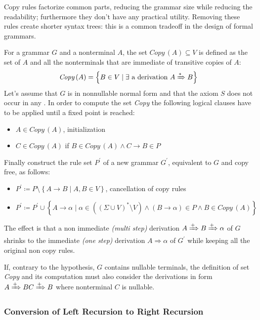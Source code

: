 \documentclass[english]{article}
\begin{document}
Copy rules factorize common parts, reducing the grammar size while reducing the readability;
furthermore they don't have any practical utility.
Removing these rules create shorter syntax trees: this is a common tradeoff in the design of formal grammars.

For a grammar \(G\) and a nonterminal \(A\), the set \(\textit{Copy}\,(A) \subseteq V\) is defined as the set of \(A\) and all the nonterminals that are immediate of transitive copies of \(A\):
\[ \textit{Copy}\,(A) = \left\{ B \in V \mid \exists \text{ a derivation } A \xRightarrow{\ast} B \right\} \]
Let's assume that \(G\) is in nonnullable normal form and that the axiom \(S\) does not occur in any \RP.
In order to compute the set \textit{Copy} the following logical clauses have to be applied until a fixed point is reached:
\begin{itemize}
  \item \(A \in \textit{Copy}\,(A)\), initialization
  \item \(C \in \textit{Copy}\,(A)\) if \(B \in \textit{Copy}\,(A) \land C \rightarrow B \in P\)
\end{itemize}
Finally construct the rule set \(P^\prime\) of a new grammar \(G^\prime\), equivalent to \(G\) and copy free, as follows:
\begin{itemize}
  \item \(P^\prime \coloneqq P \setminus \left\{ A \rightarrow B \mid A, B \in V \right\}\), cancellation of copy rules
  \item \(P^\prime \coloneqq P^\prime \cup \left\{ A \rightarrow \alpha \mid \alpha \in \left( \left( \Sigma \cup V \right)^\ast \setminus V \right) \land \left( B \rightarrow \alpha \right) \in P \land B \in \textit{Copy}\,(A) \right\}\)
\end{itemize}

The effect is that a non immediate \textit{(multi step)} derivation \(A \xRightarrow{+} B \xRightarrow{+} \alpha\) of \(G\) shrinks to the immediate \textit{(one step)} derivation \(A \Rightarrow \alpha\) of \(G^\prime\) while keeping all the original non copy rules.

\bigskip
If, contrary to the hypothesis, \(G\) contains nullable terminals, the definition of set \textit{Copy} and its computation must also consider the derivations in form \(A \xRightarrow{+} BC \xRightarrow{+} B\) where nonterminal \(C\) is nullable.

\subsubsection{Conversion of Left Recursion to Right Recursion}
\label{sec:conversion-of-left-recursion-to-right-recursion}
\end{document}
